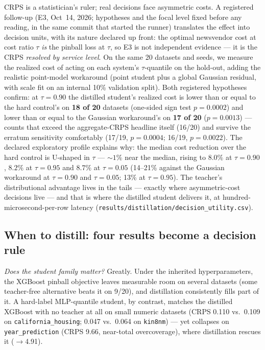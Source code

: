 \documentclass[11pt]{article}
\begin{document}
CRPS is a statistician's ruler; real decisions face asymmetric costs.
A registered follow-up (E3, Oct~14, 2026; hypotheses and the focal level fixed before any reading, in the same commit that started the runner) translates the effect
into decision units, with its nature declared up front: the optimal
newsvendor cost at cost ratio $\tau$ \emph{is} the pinball loss at
$\tau$, so E3 is not independent evidence --- it is the CRPS
\emph{resolved by service level}. On the same 20 datasets and seeds,
we measure the realized cost of acting on each system's
$\tau$-quantile on the hold-out, adding the realistic point-model
workaround (point student plus a global Gaussian residual, with scale
fit on an internal 10\% validation split). Both registered
hypotheses confirm: at $\tau{=}0.90$ the distilled student's realized
cost is lower than or equal to the hard control's on \textbf{18 of
20} datasets (one-sided sign test $p{=}0.0002$) and lower than or
equal to the Gaussian workaround's on \textbf{17 of 20}
($p{=}0.0013$) --- counts that exceed the aggregate-CRPS headline
itself (16/20) and survive the erratum sensitivity comfortably (17/19,
$p{=}0.0004$; 16/19, $p{=}0.0022$). The declared exploratory profile
explains why: the
median cost reduction over the hard control is U-shaped in $\tau$ ---
${\sim}1\%$ near the median, rising to $8.0\%$ at $\tau{=}0.90$,
$8.2\%$ at $\tau{=}0.95$ and $8.7\%$ at $\tau{=}0.05$ (14--21\%
against the Gaussian workaround at $\tau{=}0.90$ and $\tau{=}0.05$;
13\% at $\tau{=}0.95$). The teacher's
distributional advantage lives in the tails --- exactly where
asymmetric-cost decisions live --- and that is where the distilled
student delivers it, at hundred-microsecond-per-row latency
(\texttt{results/\allowbreak distillation/\allowbreak decision\_\allowbreak utility.\allowbreak csv}).

\subsection{When to distill: four results become a decision rule}
\label{sec:rule}

\emph{Does the student family matter?} Greatly. Under the inherited
hyperparameters, the XGBoost pinball
objective leaves measurable room on several datasets (some
teacher-free alternative beats it on 9/20), and distillation
consistently fills part of it. A hard-label MLP-quantile student, by contrast, matches the
distilled XGBoost with no teacher at all on small numeric datasets (CRPS
0.110 vs.\ 0.109 on \texttt{california\_\allowbreak housing}; 0.047 vs.\ 0.064 on
\texttt{kin8nm}) --- yet collapses on \texttt{year\_\allowbreak prediction} (CRPS 9.66,
near-total overcoverage), where distillation rescues it ($\to$4.91).
\end{document}
